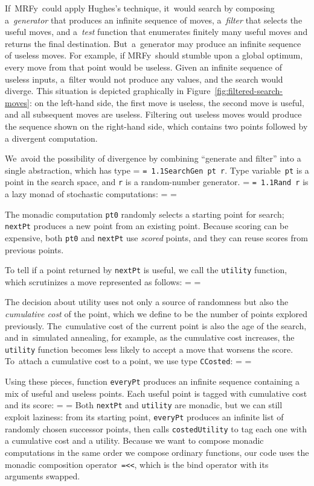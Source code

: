 \documentclass[]{jfp1}
\makeatletter
\newcommand\mrfy{MRFy} %
\newcommand\figref[1]{Figure~\ref{fig:#1}}
\newif\ifverbatimsmall
\newcommand{\mono}[1]{%
  {\@tempdima = \fontdimen2\font
   \texttt{\spaceskip = 1.1\@tempdima #1}}}
\newcommand\smallverbatiminput[1]{%
  \verbatimsmalltrue
  \presvtopsep=\topsep
  \topsep=0.78\topsep
  \verbatimsmallfalse
  \topsep=\presvtopsep
}
\newcommand\smallfuzzverbatiminput[2]{%
  \hfuzz=#1 \smallverbatiminput{#2}\hfuzz=0pt }
\makeatother
\begin{document}
If~\mrfy\ could apply Hughes's technique, it~would search by composing
a~\emph{generator} 
that produces an infinite sequence of moves, 
a~\emph{filter} that selects the useful moves, and 
a~\emph{test} function that enumerates finitely many useful moves
and returns the final destination.
But~a~generator may produce an infinite sequence of useless moves.
For example, if \mrfy\ should stumble upon a global optimum, every move from
that point would be useless.
Given an infinite sequence of useless inputs, a~filter would not
produce any values, and the search would diverge.
This situation is depicted graphically in
\figref{filtered-search-moves}:
on the left-hand side, 
the first move is useless, the second move is useful, and all
subsequent moves are useless.
Filtering out useless moves would produce the sequence shown on the
right-hand side, which contains two points followed by a divergent
computation. 

We~avoid the possibility of divergence by combining ``generate and
filter'' into a 
single abstraction, which has type \mono{SearchGen pt r}.
Type variable~\texttt{pt} is a point in the search
space, and \texttt{r} is a
random-number generator.
\mono{Rand~r} is a lazy monad of stochastic computations:
\smallverbatiminput{gen.tex}
The monadic computation \texttt{pt0} randomly selects a starting point
for search;
\texttt{nextPt} produces a new point from
an existing point.
Because scoring can be expensive, both \texttt{pt0}
and \texttt{nextPt} use \emph{scored} points, and they can
reuse scores from previous points.

To tell if a point returned by \texttt{nextPt} is useful, we call
 the \texttt{utility} function,
which scrutinizes a move represented as follows:
\smallverbatiminput{move}
The decision about utility uses not only a source of randomness but
also the \emph{cumulative cost} of the point, which we define to be
the number of points explored previously.
The~cumulative cost of the current point is also the age of the
search,
and
in~simulated annealing, for example, as the cumulative cost increases,
the \texttt{utility} function becomes less likely to accept a move
that worsens the score.
To~attach a cumulative cost to a point, we use type \texttt{CCosted}:
\smallverbatiminput{aged}

Using these pieces, function \texttt{everyPt} produces an infinite
sequence containing a mix of useful and useless points.
Each useful point is tagged with cumulative cost and its score:
\smallfuzzverbatiminput{6pt}{everygen}
Both \texttt{nextPt} and \texttt{utility} are monadic, but 
we can still exploit laziness:
from its starting point, \texttt{everyPt} produces an infinite list of
randomly chosen successor points, then calls \texttt{costedUtility} to
tag each one with a cumulative cost and a utility.
Because we want to compose monadic computations in the same order we
compose ordinary functions, 
our code uses the monadic composition
operator~\texttt{=<<}, which is the bind operator with its arguments
swapped.
\end{document}
